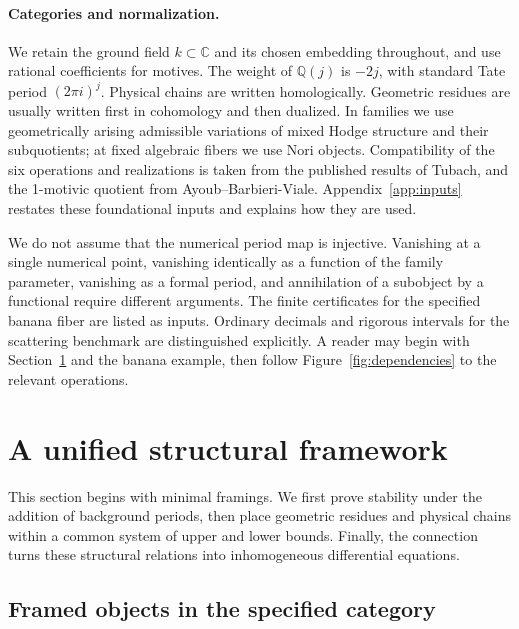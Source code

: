 \documentclass[11pt,a4paper,oneside]{article}
\theoremstyle{plain}
\theoremstyle{definition}
\theoremstyle{remark}
\newcommand{\Q}{\mathbb Q}
\newcommand{\im}{\operatorname{im}}
\newcommand{\dR}{\mathrm{dR}}
\numberwithin{equation}{section}
\begin{document}
\paragraph{Categories and normalization.}\label{sec:notation}
We retain the ground field $k\subset\mathbb C$ and its chosen embedding throughout, and use rational coefficients for motives. The weight of $\mathbb Q(j)$ is $-2j$, with standard Tate period $(2\pi i)^j$. Physical chains are written homologically. Geometric residues are usually written first in cohomology and then dualized. In families we use geometrically arising admissible variations of mixed Hodge structure and their subquotients; at fixed algebraic fibers we use Nori objects. Compatibility of the six operations and realizations is taken from the published results of Tubach\cite{tubach}, and the 1-motivic quotient from Ayoub--Barbieri-Viale\cite{abv}. Appendix~\ref{app:inputs} restates these foundational inputs and explains how they are used.

We do not assume that the numerical period map is injective. Vanishing at a single numerical point, vanishing identically as a function of the family parameter, vanishing as a formal period, and annihilation of a subobject by a functional require different arguments. The finite certificates for the specified banana fiber are listed as inputs. Ordinary decimals and rigorous intervals for the scattering benchmark are distinguished explicitly. A reader may begin with Section~\ref{ch:unified} and the banana example, then follow Figure~\ref{fig:dependencies} to the relevant operations.


\section{A unified structural framework}\label{ch:unified}
This section begins with minimal framings. We first prove stability under the addition of background periods, then place geometric residues and physical chains within a common system of upper and lower bounds. Finally, the connection turns these structural relations into inhomogeneous differential equations.

\begingroup
\providecommand{\Q}{\mathbb Q}\providecommand{\cC}{\mathcal C}
\providecommand{\cS}{\mathcal S}\providecommand{\dR}{\mathrm{dR}}
\providecommand{\rk}{\operatorname{rk}}\providecommand{\im}{\operatorname{im}}
\subsection{Framed objects in the specified category}
\end{document}
